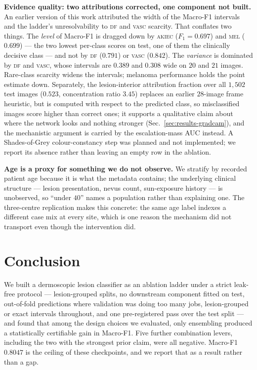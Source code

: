 \documentclass[journal]{IEEEtran}
\begin{document}
\textbf{Evidence quality: two attributions corrected, one component not built.} An earlier
version of this work attributed the width of the Macro-F1 intervals and the ladder's
unresolvability to \textsc{df} and \textsc{vasc} scarcity. That conflates two things. The
\emph{level} of Macro-F1 is dragged down by \textsc{akiec} ($F_1 = 0.697$) and \textsc{mel}
($0.699$) --- the two lowest per-class scores on test, one of them the clinically decisive
class --- and not by \textsc{df} ($0.791$) or \textsc{vasc} ($0.842$). The \emph{variance} is
dominated by \textsc{df} and \textsc{vasc}, whose intervals are $0.389$ and $0.308$ wide on
$20$ and $21$ images. Rare-class scarcity widens the intervals; melanoma performance holds the
point estimate down. Separately, the lesion-interior attribution fraction over all $1{,}502$
test images ($0.523$, concentration ratio $3.45$) replaces an earlier $28$-image frame
heuristic, but is computed with respect to the predicted class, so misclassified images score
higher than correct ones; it supports a qualitative claim about where the network looks and
nothing stronger (Sec.~\ref{sec:results-gradcam}), and the mechanistic argument is carried by
the escalation-mass AUC instead. A Shades-of-Grey colour-constancy step was planned and not
implemented; we report its absence rather than leaving an empty row in the ablation.

\textbf{Age is a proxy for something we do not observe.} We stratify by recorded patient age
because it is what the metadata contains; the underlying clinical structure --- lesion
presentation, nevus count, sun-exposure history --- is unobserved, so ``under $40$'' names a
population rather than explaining one. The three-centre replication makes this concrete: the
same age label indexes a different case mix at every site, which is one reason the mechanism
did not transport even though the intervention did.

\section{Conclusion}

We built a dermoscopic lesion classifier as an ablation ladder under a strict leak-free
protocol --- lesion-grouped splits, no downstream component fitted on test, out-of-fold
predictions where validation was doing too many jobs, lesion-grouped or exact intervals
throughout, and one pre-registered pass over the test split --- and found that among the
design choices we evaluated, only ensembling produced a statistically certifiable gain in
Macro-F1. Five further combination levers, including the two with the strongest prior claim,
were all negative. Macro-F1 $0.8047$ is the ceiling of these checkpoints, and we report that
as a result rather than a gap.
\end{document}
